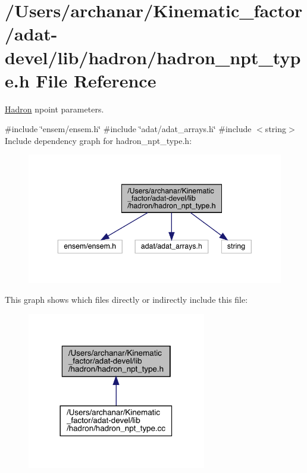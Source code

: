 \hypertarget{adat-devel_2lib_2hadron_2hadron__npt__type_8h}{}\section{/\+Users/archanar/\+Kinematic\+\_\+factor/adat-\/devel/lib/hadron/hadron\+\_\+npt\+\_\+type.h File Reference}
\label{adat-devel_2lib_2hadron_2hadron__npt__type_8h}


\mbox{\hyperlink{namespaceHadron}{Hadron}} npoint parameters.  


{\ttfamily \#include \char`\"{}ensem/ensem.\+h\char`\"{}}\newline
{\ttfamily \#include \char`\"{}adat/adat\+\_\+arrays.\+h\char`\"{}}\newline
{\ttfamily \#include $<$string$>$}\newline
Include dependency graph for hadron\+\_\+npt\+\_\+type.\+h\+:
\nopagebreak
\begin{figure}[H]
\begin{center}
\leavevmode
\includegraphics[width=343pt]{d1/dd1/adat-devel_2lib_2hadron_2hadron__npt__type_8h__incl}
\end{center}
\end{figure}
This graph shows which files directly or indirectly include this file\+:
\nopagebreak
\begin{figure}[H]
\begin{center}
\leavevmode
\includegraphics[width=221pt]{d6/d02/adat-devel_2lib_2hadron_2hadron__npt__type_8h__dep__incl}
\end{center}
\end{figure}
